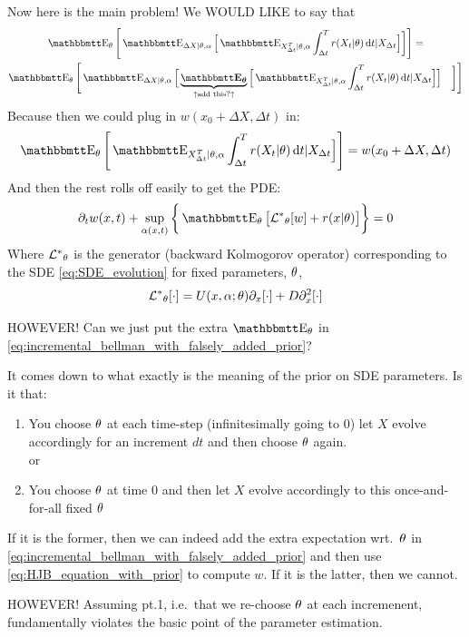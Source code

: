 Now here is the main problem! We WOULD LIKE to say that
\begin{multline}
\Exp_\th \Bigg[ \Exp_{\Delta X |\th, \a} \Big[ \Exp_{X_{\dt}^T|\th, \a}
\int_\dt^T r(X_t| \th) \intd{t} | X_\dt \Big] \bigg] \Bigg] 
= \\
\Exp_\th \Bigg[ \Exp_{\Delta X |\th, \a} \Big[ 
\underbrace{\boldsymbol{\Exp_\th}}_{\uparrow\textrm{add this?} \uparrow} \Big[
\Exp_{X_{\dt}^T|\th, \a} \int_\dt^T r(X_t| \th) \intd{t} | X_\dt \Big]\Big]
\quad \bigg] \Bigg]
\label{eq:incremental_bellman_with_falsely_added_prior}
\end{multline}
Because then we could plug in $w(x_0 + \Delta X, \Delta t)$ in:
$$
\Exp_\th \Bigg[
\Exp_{X_{\dt}^T|\th, \a} \int_\dt^T r(X_t| \th) \intd{t} | X_\dt \Big]\Bigg] =
 w(x_0
+ \Delta X, \Delta t) $$
And then the rest rolls off easily to get the PDE:
\begin{equation}
\di_t w(x,t) + \sup_{\a(x,t)} \bigg\{  \Exp_\th \big[\Lstar_\th [w] +
r(x|\th)\big] \bigg\} = 0
\label{eq:HJB_equation_with_prior}
\end{equation}
Where ${ { \mathcal{L} }^* }_{ \theta}$ is the generator (backward Kolmogorov operator) corresponding
to the SDE \cref{eq:SDE_evolution} for fixed parameters, ${ \theta}$,
$$
{ { \mathcal{L} }^* }_{ \theta}[\cdot] = U(x,\alpha; { \theta}) {\partial}_x[\cdot] + D {\partial}_x^2[\cdot]
$$

HOWEVER! Can we just put the extra
$\Exp_\th$ in \cref{eq:incremental_bellman_with_falsely_added_prior}? 

It comes down to what exactly is the meaning of the prior on
SDE parameters. Is it that:
\begin{enumerate}
  \item You choose ${ \theta}$ at each time-step (infinitesimally going to 0) let $X$
  evolve accordingly for an increment $dt$ and then choose ${ \theta}$ again.
  \\
  or
  \item You choose ${ \theta}$ at time $0$ and then let $X$ evolve accordingly to this
  once-and-for-all fixed ${ \theta}$
\end{enumerate}

If it is the former, then we can indeed add the extra expectation wrt.\ ${ \theta}$
in \cref{eq:incremental_bellman_with_falsely_added_prior} and then use
\cref{eq:HJB_equation_with_prior} to compute $w$. If it is the latter, then we
cannot.

HOWEVER! Assuming pt.1, i.e.\ that we re-choose ${ \theta}$ at each incremenent,
fundamentally violates the basic point of the parameter estimation.

